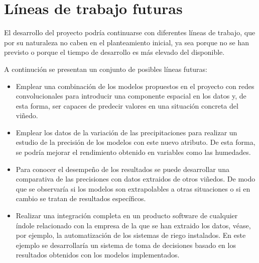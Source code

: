 \section{Líneas de trabajo futuras}
El desarrollo del proyecto podría continuarse con diferentes líneas de trabajo, que por su naturaleza
no caben en el planteamiento inicial, ya sea porque no se han previsto o porque el tiempo
de desarrollo es más elevado del disponible.

A continución se presentan un conjunto de posibles líneas futuras:
\begin{itemize}
    \item Emplear una combinación de los modelos propuestos en el proyecto con redes convolucionales
        para introducir una componente espacial en los datos y, de esta forma, ser capaces de predecir valores
        en una situación concreta del viñedo.
    \item Emplear los datos de la variación de las precipitaciones para realizar un estudio de la precisión
        de los modelos con este nuevo atributo. De esta forma, se podría mejorar el rendimiento obtenido
        en variables como las humedades. 
    \item Para conocer el desempeño de los resultados se puede desarrollar una comparativa de las precisiones
        con datos extraidos de otros viñedos. De modo que se observaría si los modelos son extrapolables
        a otras situaciones o si en cambio se tratan de resultados específicos.
    \item Realizar una integración completa en un producto software de cualquier índole relacionado con
        la empresa de la que se han extraido los datos, véase, por ejemplo, la automatización de los sistemas de riego
        instalados. En este ejemplo se desarrollaría un sistema de toma de decisiones basado en los resultados obtenidos
        con los modelos implementados.
\end{itemize}